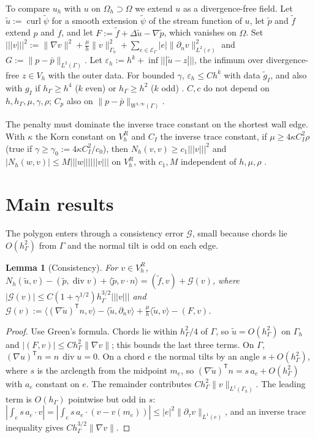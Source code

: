 \documentclass[5p,times]{elsarticle}
\newtheorem{lemma}{Lemma}
\theoremstyle{definition}
\newcommand{\hG}{h_\Gamma}
\newcommand{\Gh}{\Gamma_h}
\newcommand{\Oh}{\Omega_h}
\newcommand{\EG}{\mathcal E_\Gamma}
\newcommand{\Vh}{V_h}
\newcommand{\VR}{V_h^R}
\newcommand{\gI}{g_I}
\newcommand{\dn}{\partial_n}
\newcommand{\ut}{\tilde u}
\newcommand{\pt}{\tilde p}
\newcommand{\ft}{\tilde f}
\newcommand{\pbar}{\bar p}
\newcommand{\ip}[2]{\langle #1,#2\rangle}
\newcommand{\tnorm}[1]{|\!|\!|#1|\!|\!|}
\newcommand{\norm}[1]{\lVert #1\rVert}
\newcommand{\eps}{\varepsilon_h}
\newcommand{\Gc}{\mathcal G}
\newcommand{\curl}{\operatorname{curl}}
\renewcommand{\div}{\operatorname{div}}
\newcommand{\ext}[1]{\cite[#1]{PadhiExt}}
\begin{document}
To compare $u_h$ with $u$ on $\Oh\supset\Omega$ we extend $u$ as a divergence-free field. Let $\ut:=\curl\tilde\psi$ for a smooth extension $\tilde\psi$ of the stream function of $u$, let $\pt$ and $\ft$ extend $p$ and $f$, and let $F:=\ft+\Delta\ut-\nabla\pt$, which vanishes on $\Omega$. Set
$\tnorm v^2:=\norm{\nabla v}^2+\frac\mu h\norm v^2_{\Gh}+\sum_{e\in\EG}|e|\norm{\dn v}^2_{L^2(e)}$ and $G:=\norm{p-\pbar}_{L^2(\Gamma)}$.
Let $\eps:=h^k+\inf\tnorm{\ut-z}$, the infimum over divergence-free $z\in\Vh$ with the outer data. For bounded $\gamma$, $\eps\le Ch^k$ with data $\tilde g_I$, and also with $\gI$ if $\hG\ge h^4$ ($k$ even) or $\hG\ge h^2$ ($k$ odd) \ext{Lemmas~4.6, 7.32}. $C,c$ do not depend on $h,\hG,\mu,\gamma,\rho$; $C_p$ also on $\norm{p-\pbar}_{W^{1,\infty}(\Gamma)}$.

The penalty must dominate the inverse trace constant on the shortest wall edge. With $\kappa$ the Korn constant on $\VR$ and $C_I$ the inverse trace constant, if $\mu\ge4\kappa C_I^2\rho$ (true if $\gamma\ge\gamma_0:=4\kappa C_I^2/c_0$), then $N_h(v,v)\ge c_1\tnorm v^2$ and $|N_h(w,v)|\le M\tnorm w\tnorm v$ on $\VR$, with $c_1,M$ independent of $h,\mu,\rho$ \ext{Lemma~4.2}.

\section{Main results}\label{sec:results}

The polygon enters through a consistency error $\Gc$, small because chords lie $O(\hG^2)$ from $\Gamma$ and the normal tilt is odd on each edge.

\begin{lemma}[Consistency]\label{lem:consist}
For $v\in\VR$, $N_h(\ut,v)-(\pt,\div v)+\ip{\pt}{v\cdot n}=(\ft,v)+\Gc(v)$, where $|\Gc(v)|\le C(1+\gamma^{1/2})\hG^{3/2}\tnorm v$ and
$\Gc(v):=\ip{(\nabla\ut)^{\mathsf T}n}{v}-\ip{\ut}{\dn v}+\frac\mu h\ip{\ut}{v}-(F,v)$.
\end{lemma}

\begin{proof}
Use Green's formula. Chords lie within $\hG^2/4$ of $\Gamma$, so $\ut=O(\hG^2)$ on $\Gh$ and $|(F,v)|\le C\hG^2\norm{\nabla v}$; this bounds the last three terms. On $\Gamma$, $(\nabla u)^{\mathsf T}n=n\,\div u=0$. On a chord $e$ the normal tilts by an angle $s+O(\hG^2)$, where $s$ is the arclength from the midpoint $m_e$, so $(\nabla\ut)^{\mathsf T}n=s\,a_e+O(\hG^2)$ with $a_e$ constant on $e$. The remainder contributes $C\hG^2\norm v_{L^1(\Gh)}$. The leading term is $O(\hG)$ pointwise but odd in $s$: $|\int_es\,a_e\cdot v|=|\int_es\,a_e\cdot(v-v(m_e))|\le|e|^2\norm{\partial_\tau v}_{L^1(e)}$, and an inverse trace inequality gives $C\hG^{3/2}\norm{\nabla v}$.
\end{proof}
\end{document}
